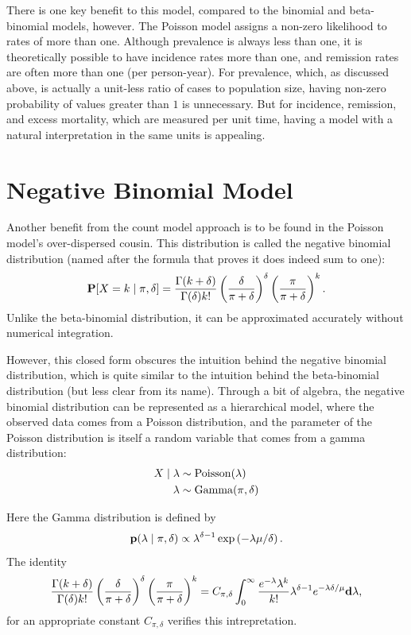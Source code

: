 There is one key benefit to this model, compared to the binomial and
beta-binomial models, however.  The Poisson model assigns a non-zero
likelihood to rates of more than one.  Although prevalence is always
less than one, it is theoretically possible to have incidence rates
more than one, and remission rates are often more than one (per
person-year).  For prevalence, which, as discussed above, is actually
a unit-less ratio of cases to population size, having non-zero
probability of values greater than $1$ is unnecessary.  But for
incidence, remission, and excess mortality, which are measured per
unit time, having a model with a natural interpretation in the same
units is appealing.


\section{Negative Binomial Model}
Another benefit from the count model approach is to be found in the
Poisson model's over-dispersed cousin.  This distribution is called
the negative binomial distribution (named after the formula that
proves it does indeed sum to one):
\[
\mathbf{P}[X = k\;|\; \pi, \delta] =
 \frac{\Gamma(k+\delta)}{\Gamma(\delta)k!} \left(\frac{\delta}{\pi+\delta}\right)^\delta \left(\frac{\pi}{\pi+\delta}\right)^k.
\]
Unlike the beta-binomial distribution, it can be approximated
accurately without numerical integration.

However, this closed form obscures the intuition behind the negative
binomial distribution, which is quite similar to the intuition behind
the beta-binomial distribution (but less clear from its name). Through
a bit of algebra, the negative binomial distribution can be
represented as a hierarchical model, where the observed data comes
from a Poisson distribution, and the parameter of the Poisson
distribution is itself a random variable that comes from a gamma
distribution:
\begin{align*}
X\;|\; \lambda &\sim \operatorname{Poisson}(\lambda)\\
\lambda &\sim \operatorname{Gamma}(\pi, \delta)
\end{align*}

Here the Gamma distribution is defined by
\[
\mathbf{p}(\lambda \;|\; \pi, \delta) \propto \lambda^{\delta-1} \exp\left(-\lambda \mu/\delta \right).
\]
The identity
\[
\frac{\Gamma(k+\delta)}{\Gamma(\delta)k!} \left(\frac{\delta}{\pi+\delta}\right)^\delta \left(\frac{\pi}{\pi+\delta}\right)^k
=
 C_{\pi, \delta} \int_0^\infty \frac{e^{-\lambda}\lambda^k}{k!} \lambda^{\delta-1} e^{-\lambda \delta/\mu} \mathbf{d} \lambda,
\]
for an appropriate constant $C_{\pi,\delta}$ verifies this intrepretation.

